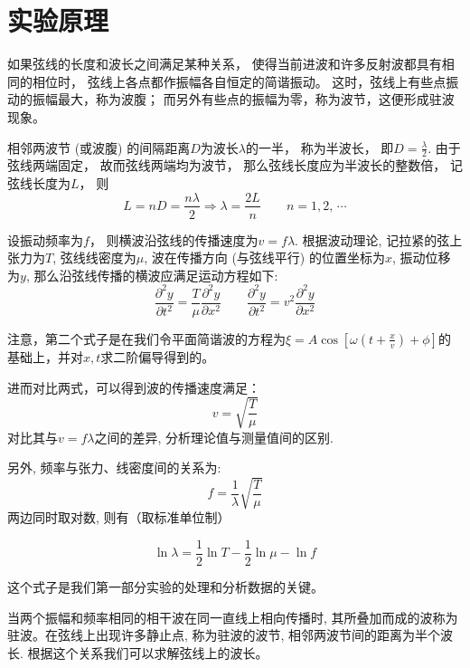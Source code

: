 \documentclass[11pt]{article}
\newcommand*{\pderivh}[3]{\frac{\partial^{#1} #2}{\partial {#3^{#1}}}}
\begin{document}








\section{实验原理}

如果弦线的长度和波长之间满足某种关系，
使得当前进波和许多反射波都具有相同的相位时，
弦线上各点都作振幅各自恒定的简谐振动。
这时，弦线上有些点振动的振幅最大，称为波腹；
而另外有些点的振幅为零，称为波节，这便形成驻波现象。

相邻两波节 (或波腹) 的间隔距离$D$为波长$\lambda$的一半，
 称为半波长， 即$D=\frac{\lambda}{2}$. 由于弦线两端固定， 
 故而弦线两端均为波节， 那么弦线长度应为半波长的整数倍，
  记弦线长度为$L$， 则
\[
    L = nD = \frac{n\lambda}{2} \Longrightarrow \lambda = \frac{2L}{n} \qquad n=1,2,\,\cdots
\]

设振动频率为$f$， 则横波沿弦线的传播速度为$v=f\lambda$.
根据波动理论, 记拉紧的弦上张力为$T$,
弦线线密度为$\mu$, 波在传播方向 (与弦线平行) 的位置坐标为$x$, 
 振动位移为$y$, 那么沿弦线传播的横波应满足运动方程如下: 
\[
    \pderivh{2}yt = \frac{T}{\mu} \pderivh{2}yx  \qquad  \pderivh{2}yt = v^2\pderivh{2}yx
\]

注意，第二个式子是在我们令平面简谐波的方程为$\xi =A\cos\left[\omega \left(t+\frac{x}{v}\right)+\phi\right]$的基础上，并对$x,t$求二阶偏导得到的。

进而对比两式，可以得到波的传播速度满足：
\[
    v = \sqrt{\frac{T}{\mu}}
\]
对比其与$v = f\lambda$之间的差异, 
分析理论值与测量值间的区别. 

另外, 频率与张力、线密度间的关系为:
\[
    f = \frac{1}{\lambda} \sqrt{\frac T\mu}
\]
两边同时取对数, 则有（取标准单位制）
\begin{framed}
\begin{equation*} \label{eq:声速对数}
    \ln\lambda = \frac{1}{2}\ln T - \frac{1}{2}\ln\mu - \ln f
\end{equation*}
\end{framed}
这个式子是我们第一部分实验的处理和分析数据的关键。

当两个振幅和频率相同的相干波在同一直线上相向传播时,
其所叠加而成的波称为驻波。在弦线上出现许多静止点, 称为驻波的波节, 
相邻两波节间的距离为半个波长. 根据这个关系我们可以求解弦线上的波长。
\end{document}
